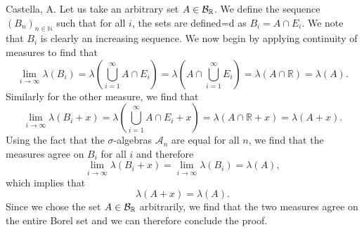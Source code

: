 \begin{solution}[3.19]{Castella, A.}
    Let us take an arbitrary set $A \in \mathcal B_{\mathbb R}$. We define the sequence $(B_n)_{n\in\mathbb{N}}$ such that for all $i$, the sets are defined=d as $B_i = A\cap E_i$. We note that $B_i$ is clearly an increasing sequence. We now begin by applying continuity of measures to find that
    $$
        \lim_{i\rightarrow\infty}\lambda(B_i) = \lambda\left(\bigcup_{i=1}^\infty A\cap E_i\right) = \lambda\left(A\cap\bigcup_{i=1}^\infty E_i\right) = \lambda(A\cap\mathbb{R}) = \lambda(A).
    $$
    Similarly for the other measure, we find that
    $$
        \lim_{i\rightarrow\infty}\lambda(B_i + x) = \lambda\left(\bigcup_{i=1}^\infty A\cap E_i + x\right) = \lambda(A\cap\mathbb{R} + x) = \lambda(A+x).
    $$
    Using the fact that the $\sigma$-algebras $\mathcal{A}_n$ are equal for all $n$, we find that the measures agree on $B_i$ for all $i$ and therefore
    $$
        \lim_{i\rightarrow\infty}\lambda(B_i + x) = \lim_{i\rightarrow\infty}\lambda(B_i) = \lambda(A),
    $$
    which implies that
    $$
        \lambda(A + x) = \lambda(A).
    $$
    Since we chose the set $A \in \mathcal B_{\mathbb R}$ arbitrarily, we find that the two measures agree on the entire Borel set and we can therefore conclude the proof.
\end{solution}

